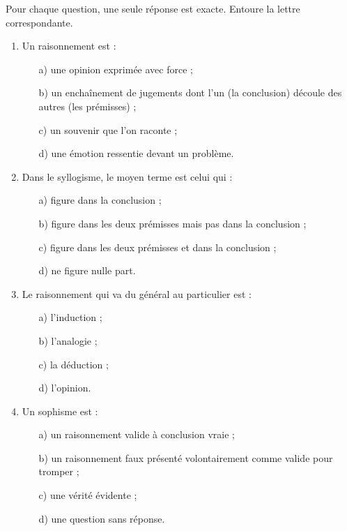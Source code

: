 \documentclass[11pt]{article}
\begin{document}
\begin{exercice}
Pour chaque question, une seule réponse est exacte. Entoure la lettre correspondante.
\begin{enumerate}
\item Un raisonnement est :
\begin{enumerate}
\item[a)] une opinion exprimée avec force ;
\item[b)] un enchaînement de jugements dont l'un (la conclusion) découle des autres (les prémisses) ;
\item[c)] un souvenir que l'on raconte ;
\item[d)] une émotion ressentie devant un problème.
\end{enumerate}
\item Dans le syllogisme, le moyen terme est celui qui :
\begin{enumerate}
\item[a)] figure dans la conclusion ;
\item[b)] figure dans les deux prémisses mais pas dans la conclusion ;
\item[c)] figure dans les deux prémisses et dans la conclusion ;
\item[d)] ne figure nulle part.
\end{enumerate}
\item Le raisonnement qui va du général au particulier est :
\begin{enumerate}
\item[a)] l'induction ; \item[b)] l'analogie ; \item[c)] la déduction ; \item[d)] l'opinion.
\end{enumerate}
\item Un sophisme est :
\begin{enumerate}
\item[a)] un raisonnement valide à conclusion vraie ;
\item[b)] un raisonnement faux présenté volontairement comme valide pour tromper ;
\item[c)] une vérité évidente ;
\item[d)] une question sans réponse.
\end{enumerate}
\end{enumerate}
\end{exercice}
\end{document}

